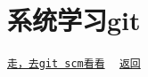  ~\newline
 \section*{系统学习git}

\href{https://git-scm.com/book/zh/v1}{\tt 走，去git scm看看} ~\newline
 \href{.}{\tt 返回} 